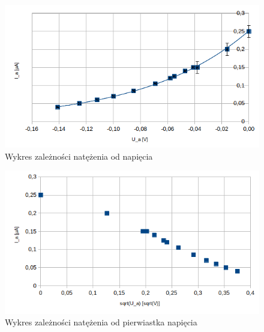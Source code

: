\documentclass[a4paper]{article}
\begin{document}
\begin{figure}
	\includegraphics[scale=1]{T2_Ia_U}
	\centering
	\caption{Wykres zależności natężenia od napięcia}
\end{figure}

\begin{figure}
	\includegraphics[scale=1]{T2_Ia_sqrtU}
	\centering
	\caption{Wykres zależności natężenia od pierwiastka napięcia}
\end{figure}
\end{document}
